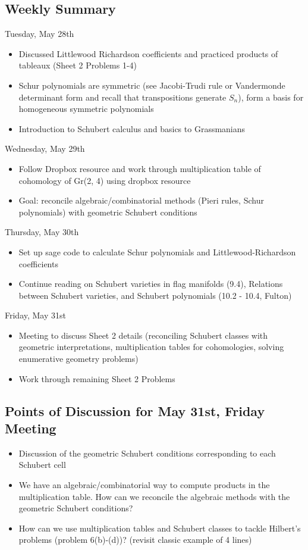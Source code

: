 
\subsection{Weekly Summary}

Tuesday, May 28th
\begin{itemize}
    \item Discussed Littlewood Richardson coefficients and practiced products of tableaux (Sheet 2 Problems 1-4)
    \item Schur polynomials are symmetric (see Jacobi-Trudi rule or Vandermonde determinant form and recall that transpositions generate $S_n$), form a basis for homogeneous symmetric polynomials
    \item Introduction to Schubert calculus and basics to Grassmanians
\end{itemize}

Wednesday, May 29th
\begin{itemize}
    \item Follow Dropbox resource and work through multiplication table of cohomology of Gr(2, 4) using dropbox resource
    \item Goal: reconcile algebraic/combinatorial methods (Pieri rules, Schur polynomials) with geometric Schubert conditions

\end{itemize}

Thursday, May 30th
\begin{itemize}
    \item Set up sage code to calculate Schur polynomials and Littlewood-Richardson coefficients
    \item Continue reading on Schubert varieties in flag manifolds (9.4), Relations between Schubert varieties, and Schubert polynomials (10.2 - 10.4, Fulton)
\end{itemize}

Friday, May 31st
\begin{itemize}
    \item Meeting to discuss Sheet 2 details (reconciling Schubert classes with geometric interpretations, multiplication tables for cohomologies, solving enumerative geometry problems)
    \item Work through remaining Sheet 2 Problems
\end{itemize}

\subsection{Points of Discussion for May 31st, Friday Meeting}
\begin{itemize}
    \item Discussion of the geometric Schubert conditions corresponding to each Schubert cell
    
    \item We have an algebraic/combinatorial way to compute products in the multiplication table. How can we reconcile the algebraic methods with the geometric Schubert conditions?

    \item How can we use multiplication tables and Schubert classes to tackle Hilbert's problems (problem 6(b)-(d))? (revisit classic example of 4 lines)
\end{itemize}